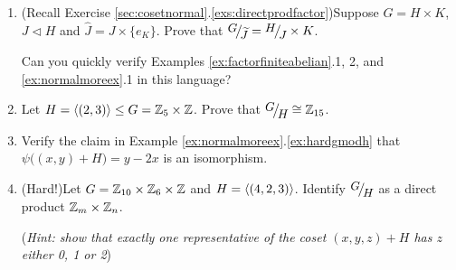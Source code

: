 \begin{exercises}
\begin{enumerate}
		
		\item\label{exs:normaldirectfactor} (Recall Exercise \ref*{sec:cosetnormal}.\ref{exs:directprodfactor})\lstsp Suppose $G=H\times K$, $J\triangleleft H$ and $\widehat J=J\times\{e_K\}$. Prove that $\quotient G{\widetilde J}=\quotient HJ\times K$.\par
		Can you quickly verify Examples \ref{ex:factorfiniteabelian}.1, 2, and \ref{ex:normalmoreex}.1 in this language?
		
		
		\item Let $H=\left\langle (2,3)\right\rangle\le G=\mathbb{Z}_5\times \mathbb{Z}$. Prove that $\quotient GH\cong \Z_{15}$.
		
		
		\item Verify the claim in Example \ref*{ex:normalmoreex}.\ref{ex:hardgmodh} that $\psi\bigl((x,y)+H\bigr)=y-2x$ is an isomorphism.
		
		
		\item (Hard!)\lstsp Let $G=\mathbb{Z}_{10}\times\mathbb{Z}_6\times\mathbb{Z}$ and $H=\left\langle (4,2,3)\right\rangle$. Identify $\quotient GH$ as a direct product $\mathbb{Z}_m\times\mathbb{Z}_n$.\par
		(\emph{Hint: show that exactly one representative of the coset $(x,y,z)+H$ has $z$ either 0, 1 or 2})
		
		
	

\end{enumerate}
\end{exercises}
